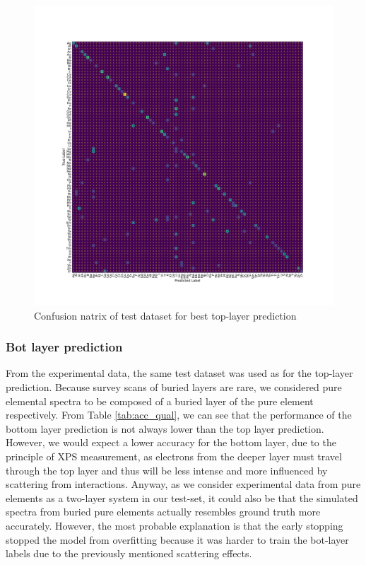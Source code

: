 \begin{center}
\begin{figure}[H]
        \centerline{\includegraphics[width=1.4\textwidth]{Figures/best_task_1_model_CM.png}}
    \centering
    \caption{Confusion natrix of test dataset for best top-layer prediction}
    \label{cm_cnn_1l}
\end{figure}
\end{center}



\subsubsection{Bot layer prediction}


From the experimental data, the same test dataset was used as for the top-layer prediction. Because survey scans of buried layers are rare, we considered pure elemental spectra to be composed of a buried layer of the pure element respectively.
From Table \ref{tab:acc_qual}, we can see that the performance of the bottom layer prediction is not always lower than the top layer prediction. However, we would expect a lower accuracy for the bottom layer, due to the principle of XPS measurement, as electrons from the deeper layer must travel through the top layer and thus will be less intense and more influenced by scattering from interactions. Anyway, as we consider experimental data from pure elements as a two-layer system in our test-set, it could also be that the simulated spectra from buried pure elements actually resembles ground truth more accurately. However, the most probable explanation is that the early stopping stopped the model from overfitting because it was harder to train the bot-layer labels due to the previously mentioned scattering effects.




